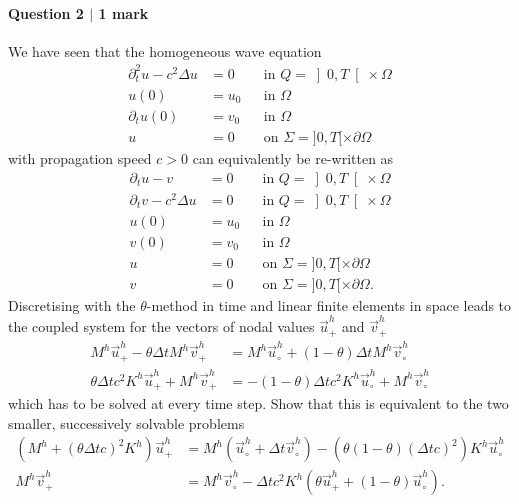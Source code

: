 \newpage

\paragraph*{Question 2 $\vert$ 1 mark}%

We have seen that the homogeneous wave equation
\begin{equation}\tag{W}\label{eq:wave}
\begin{aligned}
\partial_t^2 u - c^2 \Delta u &= 0 && \text{in } Q = \left] 0,T\right[ \times \Omega\\
u(0) &= u_0 && \text{in } \Omega\\
\partial_t u(0) &= v_0 && \text{in } \Omega\\
u &= 0 && \text{on } \Sigma = ]0,T[ \times \partial \Omega
\end{aligned}
\end{equation}
with propagation speed $c>0$ can equivalently be re-written as
\begin{equation}\tag{W'}\label{eq:waveSystem}
\begin{aligned}
\partial_t u - v &= 0 && \text{in } Q = \left] 0,T\right[ \times \Omega\\
\partial_t v - c^2 \Delta u &= 0 && \text{in } Q = \left] 0,T\right[ \times \Omega\\
u(0) &= u_0 && \text{in } \Omega\\
v(0) &= v_0 && \text{in } \Omega\\
u &= 0 && \text{on } \Sigma = ]0,T[ \times \partial \Omega\\
v &= 0 && \text{on } \Sigma = ]0,T[ \times \partial \Omega.
\end{aligned}
\end{equation}
Discretising with the $\theta$-method in time and linear finite elements in space leads to the coupled system for the vectors of nodal values $\vec{u}^h_+$ and $\vec{v}^h_+$
\begin{align*}
M^h \vec{u}^h_+ - \theta \Delta t M^h \vec{v}^h_+ &= M^h \vec{u}^h_\circ + (1-\theta) \Delta t M^h\vec{v}^h_\circ\\
\theta \Delta t c^2 K^h \vec{u}^h_+ + M^h \vec{v}^h_+ &= -(1-\theta) \Delta t c^2 K^h \vec{u}^h_\circ + M^h \vec{v}^h_\circ
\end{align*}
which has to be solved at every time step. Show that this is equivalent to the two smaller, successively solvable problems
\begin{align*}
\left(M^h + \left(\theta \Delta t c\right)^2 K^h\right) \vec{u}^h_+ &= M^h \left( \vec{u}^h_\circ + \Delta t \vec{v}^h_\circ\right) - \left( \theta\left(1-\theta\right) \left(\Delta t c\right)^2 \right)K^h \vec{u}^h_\circ\\
M^h \vec{v}^h_+ &= M^h \vec{v}^h_\circ - \Delta t c^2 K^h \left( \theta \vec{u}^h_+ + \left(1-\theta\right) \vec{u}^h_\circ\right).
\end{align*}


